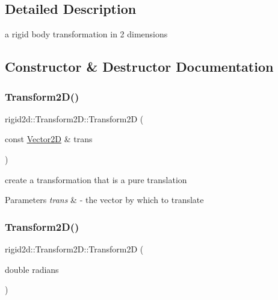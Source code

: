 \subsection{Detailed Description}
a rigid body transformation in 2 dimensions 

\subsection{Constructor \& Destructor Documentation}
\mbox{\label{classrigid2d_1_1Transform2D_ab3e595da2315ed50ba8eb24ead0c8d78}} 
\subsubsection{\texorpdfstring{Transform2\+D()}{Transform2D()}\hspace{0.1cm}{\footnotesize\ttfamily [1/3]}}
{\footnotesize\ttfamily rigid2d\+::\+Transform2\+D\+::\+Transform2D (\begin{DoxyParamCaption}\item[{const \hyperlink{structrigid2d_1_1Vector2D}{Vector2D} \&}]{trans }\end{DoxyParamCaption})\hspace{0.3cm}{\ttfamily [explicit]}}



create a transformation that is a pure translation 


\begin{DoxyParams}{Parameters}
{\em trans} & -\/ the vector by which to translate \\
\hline
\end{DoxyParams}
\mbox{\label{classrigid2d_1_1Transform2D_a3f2f654cb039320e331931c0877b39a3}} 
\subsubsection{\texorpdfstring{Transform2\+D()}{Transform2D()}\hspace{0.1cm}{\footnotesize\ttfamily [2/3]}}
{\footnotesize\ttfamily rigid2d\+::\+Transform2\+D\+::\+Transform2D (\begin{DoxyParamCaption}\item[{double}]{radians }\end{DoxyParamCaption})\hspace{0.3cm}{\ttfamily [explicit]}}



